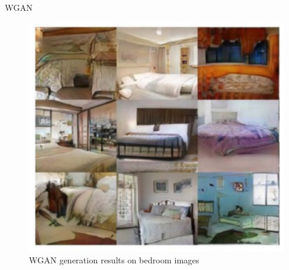 \begin{frame}[allowframebreaks]{WGAN}
\framebreak
\begin{figure}
    \centering
    \includegraphics[height=0.8\textheight, width=\textwidth, keepaspectratio]{images/gan/wgan_5.png}
    \caption{WGAN generation results on bedroom images}
\end{figure}

\end{frame}